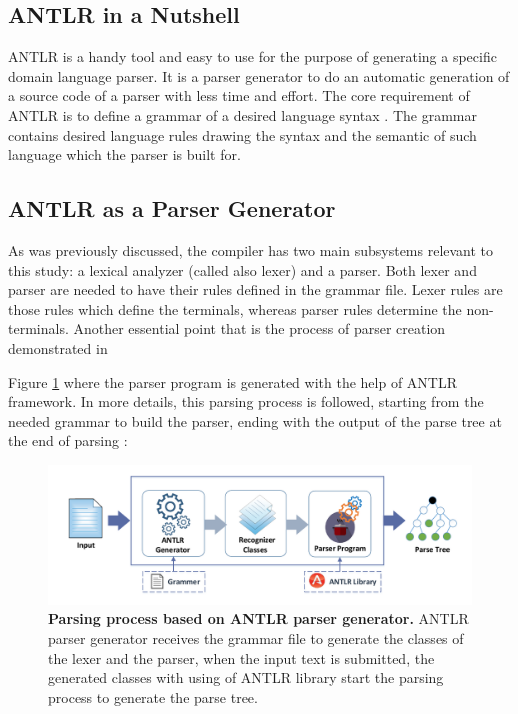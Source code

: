 \subsection{ANTLR in a Nutshell }
ANTLR is a handy tool and easy to use for the purpose of generating a specific domain language parser. It is a parser generator to do an automatic generation of a source code of a parser with less time and effort. The core requirement of ANTLR is to define a grammar of a desired language syntax . The grammar contains desired language rules  drawing the syntax and the semantic of such  language which the parser is built for. 
\subsection{ ANTLR as a Parser Generator }
 As was previously discussed, the compiler has two main subsystems relevant to this study: a lexical analyzer (called also lexer) and a parser. Both lexer and parser are needed to have their rules defined in the grammar file. Lexer rules are those rules which define the terminals, whereas parser rules determine the non-terminals. Another essential point that is the process of parser creation  demonstrated in {Figure \ref{Fig:ANTLR} where the parser program is generated with the help of ANTLR framework. In more details, this parsing process \cite{ANTLR:Tool:Online} is followed, starting from the needed grammar to build the parser, ending with the output of the parse tree at the end of parsing :

\begin{figure}[ht]
	\begin{center}
		\includegraphics[scale=0.52]{images/ANTLR.pdf}
				\setlength\belowcaptionskip{-5mm}
		\caption{\textbf{Parsing process based on ANTLR parser generator\cite{ANTLR:Tool:Online}.} ANTLR parser generator receives the grammar file to generate the classes of the lexer and the parser, when the input text is submitted, the generated classes with using of ANTLR library start the parsing process to generate the parse tree.}
		\label{Fig:ANTLR}
	\end{center}
\end{figure}


}
